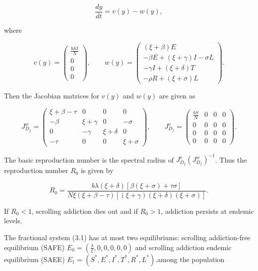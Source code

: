 \documentclass[10pt]{NSP1}
\begin{document}
\[
\frac{dy}{dt} = v(y) - w(y),
\]

where

\[
v(y) = \begin{pmatrix}
\frac{bSI}{N} \\
0 \\
0 \\
0
\end{pmatrix},\quad\quad w(y) = \begin{pmatrix}
(\xi + \beta)E \\ - \beta E + (\xi + \gamma)I - \sigma L \\ - \gamma I + (\xi + \delta)T \\ - \rho R + (\xi + \sigma)L
\end{pmatrix}.
\]

Then the Jacobian matrices for \(v(y)\) and \(w(y)\) are given as

\[
J_{D_{f}}^{w} = \begin{pmatrix}
\xi + \beta - \tau & 0 & 0 & 0 \\ - \beta & \xi + \gamma & 0 & - \sigma \\
0 & - \gamma & \xi + \delta & 0 \\ - \tau & 0 & 0 & \xi + \sigma
\end{pmatrix},\quad\quad J_{D_{f}}^{v} = \begin{pmatrix}
\frac{bS}{N} & 0 & 0 & 0 \\
0 & 0 & 0 & 0 \\
0 & 0 & 0 & 0 \\
0 & 0 & 0 & 0
\end{pmatrix}.
\]

The basic reproduction number is the spectral radius of \(J_{D_{f}}^{v}\left( J_{D_{f}}^{w} \right)^{- 1}\). Thus the reproduction number \(R_{0}\) is given by

\[
R_{0} = \frac{b\lambda(\xi + \delta)\left\lbrack \beta(\xi + \sigma) + \tau\sigma \right\rbrack}{N\xi(\xi + \beta - \tau)\left\lbrack (\xi + \gamma)(\xi + \delta)(\xi + \sigma) \right\rbrack}.
\]

If \(R_{0} < 1\), scrolling addiction dies out and if \(R_{0} > 1\), addiction persists at endemic levels.

\par\medskip{}\smallskip

The fractional system (3.1) has at most two equilibriums: scrolling addiction-free equilibrium (SAFE) \(E_{0} = \left( \frac{\lambda}{\xi},0,0,0,0,0 \right)\) and scrolling addiction endemic equilibrium (SAEE) \(E_{1} = \left( S^{*},E^{*},I^{*},T^{*},R^{*},L^{*} \right)\).among the population
\end{document}
